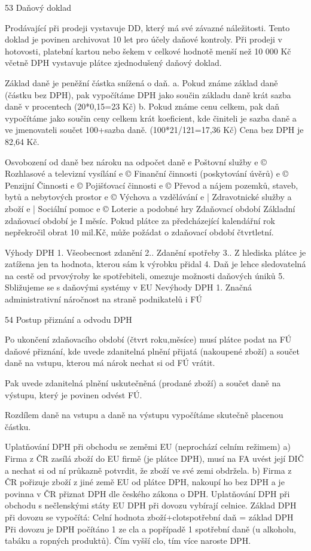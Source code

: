 53
\newpage
Daňový doklad

Prodávající při prodeji vystavuje DD, který má své závazné náležitosti. Tento doklad je
povinen archivovat 10 let pro účely daňové kontroly. Při prodeji v hotovosti, platební kartou
nebo šekem v celkové hodnotě menší než 10 000 Kč včetně DPH vystavuje plátce
zjednodušený daňový doklad.

Základ daně je peněžní částka snížená o daň.
a. Pokud známe základ daně (částku bez DPH), pak vypočítáme DPH jako součin
základu daně krát sazba daně v procentech (20*0,15=23 Kč)
b. Pokud známe cenu celkem, pak daň vypočítáme jako součin ceny celkem krát
koeficient, kde činiteli je sazba daně a ve jmenovateli součet 100+sazba daně.
(100*21/121=17,36 Kč) Cena bez DPH je 82,64 Kč.

Osvobození od daně bez nároku na odpočet daně
e Poštovní služby
e © Rozhlasové a televizní vysílání
e © Finanční činnosti (poskytování úvěrů)
e © Penzijní Činnosti
e © Pojišťovací činnosti
e © Převod a nájem pozemků, staveb, bytů a nebytových prostor
e © Výchova a vzdělávání
e | Zdravotnické služby a zboží
e | Sociální pomoc
e © Loterie a podobné hry
Zdaňovací období
Základní zdaňovací období je I měsíc. Pokud plátce za předcházející kalendářní rok
nepřekročil obrat 10 mil.Kč, může požádat o zdaňovací období čtvrtletní.

Výhody DPH
1. Všeobecnost zdanění
2.. Zdanění spotřeby
3.. Z hlediska plátce je zatížena jen ta hodnota, kterou sám k výrobku přidal
4. Daň je lehce sledovatelná na cestě od prvovýroby ke spotřebiteli,
omezuje možnosti daňových úniků
5. Sbližujeme se s daňovými systémy v EU
Nevýhody DPH
1. Značná administrativní náročnost na straně podnikatelů i FÚ

54
\newpage
Postup přiznání a odvodu DPH

Po ukončení zdaňovacího období (čtvrt roku,měsíce) musí plátce podat na FÚ daňové
přiznání, kde uvede zdanitelná plnění přijatá (nakoupené zboží) a součet daně na vstupu,
kterou má nárok nechat si od FÚ vrátit.

Pak uvede zdanitelná plnění uskutečněná (prodané zboží) a součet daně na výstupu, který je
povinen odvést FÚ.

Rozdílem daně na vstupu a daně na výstupu vypočítáme skutečně placenou částku.

Uplatňování DPH při obchodu se zeměmi EU (neprochází celním režimem)
a) Firma z ČR zasílá zboží do EU firmě (je plátce DPH), musí na FA uvést její DIČ a
nechat si od ní průkazně potvrdit, že zboží ve své zemi obdržela.
b) Firma z ČR pořizuje zboží z jiné země EU od plátce DPH, nakoupí ho bez DPH a je
povinna v ČR přiznat DPH dle českého zákona o DPH.
Uplatňování DPH při obchodu s nečlenskými státy EU
DPH při dovozu vybírají celnice. Základ DPH při dovozu se vypočítá:
Celní hodnota zboží+clotspotřební daň = základ DPH
Při dovozu je DPH počítáno 1 ze cla a popřípadě 1 spotřební daně (u alkoholu, tabáku a
ropných produktů). Čím vyšší clo, tím více naroste DPH.

